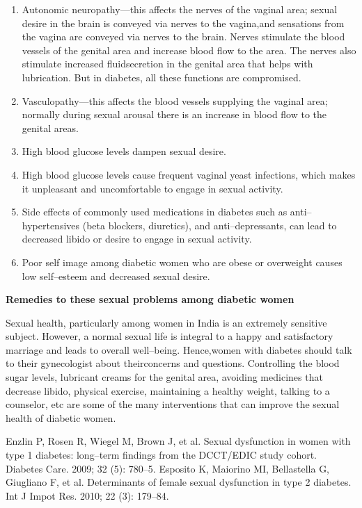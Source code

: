\vspace{-\topsep}
\begin{enumerate}[•]
\itemsep=0pt
\item Autonomic neuropathy—this affects the nerves of the vaginal area; sexual desire in the brain is conveyed via nerves to the vagina,\break and sensations from the vagina are conveyed via nerves to the brain. Nerves stimulate the blood vessels of the genital area and increase blood flow to the area. The nerves also stimulate increased fluid\break secretion in the genital area that helps with lubrication. But in dia\-betes, all these functions are compromised.
\item Vasculopathy—this affects the blood vessels supplying the vaginal area; normally during sexual arousal there is an increase in blood flow to the genital areas.
\item High blood glucose levels dampen sexual desire.
\item High blood glucose levels cause frequent vaginal yeast infections, which makes it unpleasant and uncomfortable to engage in sexual activity.
\item Side effects of commonly used medications in diabetes such as anti–hypertensives (beta blockers, diuretics), and anti–depressants, can lead to decreased libido or desire to engage in sexual activity.
\item Poor self image among diabetic women who are obese or overweight causes low self–esteem and decreased sexual desire.
\end{enumerate}
\vspace{-\topsep}

\noindent\textbf{Remedies to these sexual problems among diabetic women}

Sexual health, particularly among women in India is an extremely sensitive subject. However, a normal sexual life is integral to a happy and satisfactory marriage and leads to overall well–being. Hence,\break women with diabetes should talk to their gynecologist about their\break concerns and questions. Controlling the blood sugar levels, lubricant creams for the genital area, avoiding medicines that decrease libido, physical exercise, maintaining a healthy weight, talking to a counselor, etc are some of the many interventions that can improve the sexual health of diabetic women.

\begin{thebibliography}{99}
 Enzlin P, Rosen R, Wiegel M, Brown J, et al. Sexual dysfunction in women with type 1 diabetes: long–term findings from the DCCT/EDIC study cohort. Diabetes Care. 2009; 32 (5): 780–5.
 Esposito K, Maiorino MI, Bellastella G, Giugliano F, et al. Determinants of female sexual dysfunction in type 2 diabetes. Int J Impot Res. 2010; 22 (3): 179–84.
\end{thebibliography}


